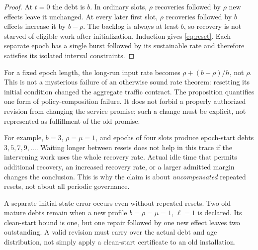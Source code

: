 \begin{proof}
At $t=0$ the debt is $b$. In ordinary slots, $\rho$ recoveries followed by $\rho$ new effects leave it unchanged. At every later first slot, $\rho$ recoveries followed by $b$ effects increase it by $b-\rho$. The backlog is always at least $b$, so recovery is not starved of eligible work after initialization. Induction gives \cref{eq:reset}. Each separate epoch has a single burst followed by its sustainable rate and therefore satisfies its isolated interval constraints.
\end{proof}

For a fixed epoch length, the long-run input rate becomes $\rho+(b-\rho)/h$, not $\rho$. This is not a mysterious failure of an otherwise sound rate theorem: resetting its initial condition changed the aggregate traffic contract. The proposition quantifies one form of policy-composition failure. It does not forbid a properly authorized revision from changing the service promise; such a change must be explicit, not represented as fulfillment of the old promise.

For example, $b=3$, $\rho=\mu=1$, and epochs of four slots produce epoch-start debts $3,5,7,9,\ldots$. Waiting longer between resets does not help in this trace if the intervening work uses the whole recovery rate. Actual idle time that permits additional recovery, an increased recovery rate, or a larger admitted margin changes the conclusion. This is why the claim is about \emph{uncompensated} repeated resets, not about all periodic governance.

A separate initial-state error occurs even without repeated resets. Two old mature debts remain when a new profile $b=\rho=\mu=1$, $\ell=1$ is declared. Its clean-start bound is one, but one repair followed by one new effect leaves two outstanding. A valid revision must carry over the actual debt and age distribution, not simply apply a clean-start certificate to an old installation.

